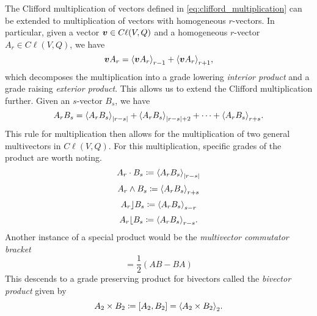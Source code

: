 The Clifford multiplication of vectors defined in \ref{eq:clifford_multiplication} can be extended to multiplication of vectors with homogeneous $r$-vectors.  In particular, given a vector $\boldsymbol{v} \in C\ell(V,Q)$ and a homogeneous $r$-vector $A_r \in C\ell(V,Q)$, we have
\begin{equation}
\label{eq:vector_multiplication}
\blade{v}A_r = \proj{r-1}{\blade{v}A_r} + \proj{r+1}{\blade{v}A_r},
\end{equation}
which decomposes the multiplication into a grade lowering \emph{interior product} and a grade raising \emph{exterior product}.  This allows us to extend the Clifford multiplication further. Given an $s$-vector $B_s$, we have
\begin{equation}
\label{eq:general_clifford_multiplication}
A_r B_s = \proj{|r-s|}{A_rB_s} + \proj{|r-s|+2}{A_rB_s} + \cdots + \proj{r+s}{A_rB_s}.
\end{equation}
This rule for multiplication then allows for the multiplication of two general multivectors in $C\ell(V,Q)$. For this multiplication, specific grades of the product are worth noting.
\begin{equation}
\label{eq:dot}
    A_r \cdot B_s \coloneqq \proj{|r-s|}{A_r B_s}
\end{equation}
\begin{equation}
\label{eq:wedge}
    A_r \wedge B_s \coloneqq \proj{r+s}{A_r B_s}
\end{equation}
\begin{equation}
\label{eq:left_contraction}
    A_r \rfloor B_s \coloneqq \proj{s-r}{A_r B_s}
\end{equation}
\begin{equation}
\label{eq:right_contraction}
    A_r \lfloor B_s \coloneqq \proj{r-s}{A_r B_s}.
\end{equation}
Another instance of a special product would be the \emph{multivector commutator bracket}
\begin{equation}
    [A,B]=\frac{1}{2}(AB-BA)
\end{equation}
This descends to a grade preserving product for bivectors called the \emph{bivector product} given by
\begin{equation}
\label{eq:commutator_product}
    A_2 \times B_2 \coloneqq [A_2,B_2] = \proj{2}{A_2 \times B_2}.
\end{equation}


